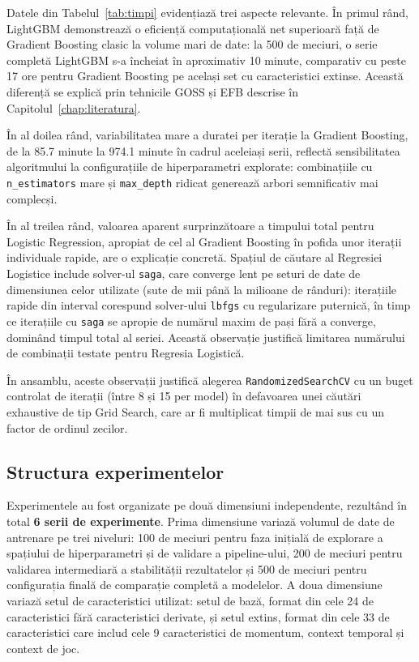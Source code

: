 Datele din Tabelul~\ref{tab:timpi} evidențiază trei aspecte relevante. În
primul rând, LightGBM demonstrează o eficiență computațională net
superioară față de Gradient Boosting clasic la volume mari de date: la 500
de meciuri, o serie completă LightGBM s-a încheiat în aproximativ 10
minute, comparativ cu peste 17 ore pentru Gradient Boosting pe același set
cu caracteristici extinse. Această diferență se explică prin tehnicile
GOSS și EFB descrise în Capitolul~\ref{chap:literatura}.

În al doilea rând, variabilitatea mare a duratei per iterație la Gradient
Boosting, de la 85.7 minute la 974.1 minute în cadrul aceleiași serii,
reflectă sensibilitatea algoritmului la configurațiile de hiperparametri
explorate: combinațiile cu \texttt{n\_estimators} mare și \texttt{max\_depth}
ridicat generează arbori semnificativ mai complecși.

În al treilea rând, valoarea aparent surprinzătoare a timpului total pentru
Logistic Regression, apropiat de cel al Gradient Boosting în pofida unor
iterații individuale rapide, are o explicație concretă. Spațiul de căutare
al Regresiei Logistice include solver-ul \texttt{saga}, care converge lent
pe seturi de date de dimensiunea celor utilizate (sute de mii până la
milioane de rânduri): iterațiile rapide din interval corespund solver-ului
\texttt{lbfgs} cu regularizare puternică, în timp ce iterațiile cu
\texttt{saga} se apropie de numărul maxim de pași fără a converge,
dominând timpul total al seriei. Această observație justifică limitarea
numărului de combinații testate pentru Regresia Logistică.

În ansamblu, aceste observații justifică alegerea \texttt{RandomizedSearchCV}
cu un buget controlat de iterații (între 8 și 15 per model) în defavoarea
unei căutări exhaustive de tip Grid Search, care ar fi multiplicat timpii
de mai sus cu un factor de ordinul zecilor.

\subsection{Structura experimentelor}

Experimentele au fost organizate pe două dimensiuni independente,
rezultând în total \textbf{6 serii de experimente}. Prima dimensiune
variază volumul de date de antrenare pe trei niveluri: 100 de meciuri
pentru faza inițială de explorare a spațiului de hiperparametri și de
validare a pipeline-ului, 200 de meciuri pentru validarea intermediară a
stabilității rezultatelor și 500 de meciuri pentru configurația finală de
comparație completă a modelelor. A doua dimensiune variază setul de
caracteristici utilizat: setul de bază, format din cele 24 de
caracteristici fără caracteristici derivate, și setul extins, format din
cele 33 de caracteristici care includ cele 9 caracteristici de momentum,
context temporal și context de joc.


